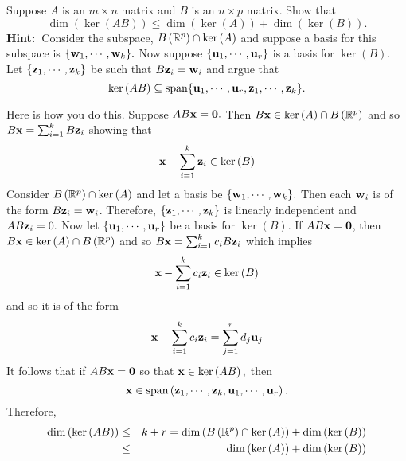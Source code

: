 \begin{enumialphparenastyle}
\begin{ex} Suppose $A$ is an $m\times n$ matrix and $B$ is an $n\times p$ matrix.
Show that 
\begin{equation*}
\dim \left( \ker \left( AB\right) \right) \leq \dim \left( \ker \left(
A\right) \right) +\dim \left( \ker \left( B\right) \right) .
\end{equation*}
\textbf{Hint:\ }Consider the subspace, $B\left( \mathbb{R}^{p}\right) \cap
\ker \left( A\right) $ and suppose a basis for this subspace is $\{
{\bf w}_{1},\cdots ,{\bf w}_{k}\} .$ Now suppose $\{
{\bf u}_{1},\cdots ,{\bf u}_{r}\} $ is a basis for $\ker \left(
B\right) .$ Let $\{{\bf z}_{1},\cdots ,{\bf z}_{k}\} $ be
such that $B{\bf z}_{i}={\bf w}_{i}$ and argue that 
\begin{equation*}
\ker \left( AB\right) \subseteq \mbox{span}\{{\bf u}_{1},\cdots ,
{\bf u}_{r},{\bf z}_{1},\cdots ,{\bf z}_{k}\} .
\end{equation*}
\vspace{1mm}
\begin{sol}
Here is how you do this. Suppose $AB{\bf x}={\bf 0}.$ Then $B{\bf x}\in \ker
\left( A\right) \cap B\left( \mathbb{R}^{p}\right) $ and so $B{\bf x}
=\sum_{i=1}^{k}B{\bf z}_{i}$ showing that
\[
{\bf x}-\sum_{i=1}^{k}{\bf z}_{i}\in \ker \left( B\right) 
\]
Consider $B\left( \mathbb{R}^{p}\right) \cap \ker \left( A\right) $ and let
a basis be $\{{\bf w}_{1},\cdots ,{\bf w}_{k}\} .$ Then
each ${\bf w}_{i}$ is of the form $B{\bf z}_{i}={\bf w}_{i}$.
Therefore, $\{{\bf z}_{1},\cdots ,{\bf z}_{k}\} $ is
linearly independent and $AB{\bf z}_{i}=0.$ Now let $\{{\bf u}
_{1},\cdots ,{\bf u}_{r}\} $ be a basis for $\ker \left( B\right) .$
If $AB{\bf x}={\bf 0}$, then $B{\bf x} \in \ker \left( A\right) \cap B\left(
\mathbb{R}^{p}\right) $ and so $B{\bf x}=\sum_{i=1}^{k}c_{i}B{\bf z}
_{i}$ which implies
\[
{\bf x}-\sum_{i=1}^{k}c_{i}{\bf z}_{i}\in \ker \left( B\right)
\]
and so it is of the form
\[
{\bf x}-\sum_{i=1}^{k}c_{i}{\bf z}_{i}=\sum_{j=1}^{r}d_{j}{\bf u}
_{j}
\]
It follows that if $AB{\bf x}={\bf 0}$ so that ${\bf x}\in \ker \left(
AB\right) ,$ then
\[
{\bf x}\in \mbox{span}\left( {\bf z}_{1},\cdots ,{\bf z}_{k},
{\bf u}_{1},\cdots ,{\bf u}_{r}\right) .
\]
Therefore,
\begin{eqnarray*}
\dim \left( \ker \left( AB\right) \right)  &\leq &k+r=\dim \left( B\left(
\mathbb{R}^{p}\right) \cap \ker \left( A\right) \right) +\dim \left( \ker
\left( B\right) \right)  \\
&\leq &\dim \left( \ker \left( A\right) \right) +\dim \left( \ker \left(
B\right) \right)
\end{eqnarray*}
\end{sol}
\end{ex}



\end{enumialphparenastyle}
